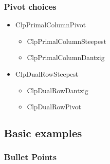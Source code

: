 \documentclass{beamer}
\begin{document}
\begin{frame}
  \frametitle{Pivot choices}
  \begin{itemize}
  \item ClpPrimalColumnPivot
    \begin{itemize}
    \item ClpPrimalColumnSteepest
    \item ClpPrimalColumnDantzig
    \end{itemize}
  \item ClpDualRowSteepest
    \begin{itemize}
    \item ClpDualRowDantzig
    \item ClpDualRowPivot
    \end{itemize}
  \end{itemize}
\end{frame}

\subsection{Basic examples}

\begin{frame}
\frametitle{Bullet Points}
\end{frame}

\end{document}

